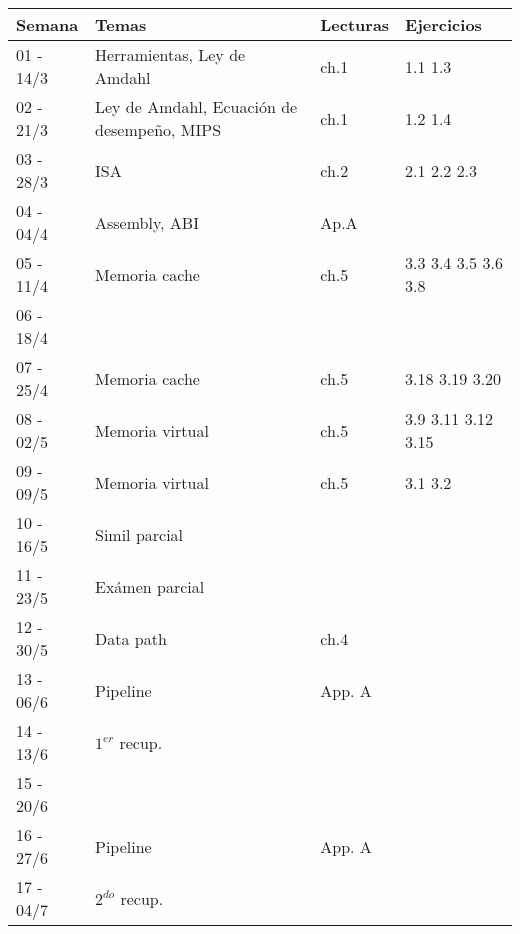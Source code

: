 \documentclass[9pt,a4paper]{article}
\begin{document}
\begin{tabular}{ |l | l | l | l |}
\hline
Semana & Temas			& Lecturas     & Ejercicios						\\
\hline
01 - 14/3	& Herramientas, Ley de Amdahl 		& ch.1 \cite{caaqa}	&	1.1 1.3		\\
\hline
02 - 21/3	& Ley de Amdahl, Ecuación de desempeño, MIPS & ch.1 \cite{caaqa}    & 1.2 1.4	\\
\hline
03 - 28/3	& ISA					&		ch.2 \cite{caaqa}	&	2.1 2.2 2.3				\\
\hline
04 - 04/4	& Assembly, ABI 	& 		Ap.A \cite{caaqa} \cite{abi} &	\\
\hline
05 - 11/4	& Memoria cache	& 	ch.5 \cite{caaqa}	&	3.3 3.4 3.5 3.6 3.8
\\
\hline
\rowcolor{lightgray} 06 - 18/4	& 	& 		&		\\
\hline
07 - 25/4	& Memoria cache	& 		ch.5 \cite{caaqa} &	 3.18 3.19 3.20
\\
\hline
08 - 02/5	& Memoria virtual	&	ch.5 \cite{caaqa} &	 3.9 3.11 3.12 3.15\\
\hline
09 - 09/5	& Memoria virtual	& 	ch.5 \cite{caaqa} \cite{vmp1} \cite{vmp2} &	3.1 3.2 \\
\hline
10 - 16/5	& Simil parcial	&		&							\\
\hline
\rowcolor{green} 11 - 23/5	& Exámen parcial	& 	&								\\
\hline
12 - 30/5	& Data path			& 	ch.4 \cite{coadhsi} & \\
\hline
13 - 06/6 & Pipeline			& App. A \cite{caaqa}	&	\\
\hline
\rowcolor{green} 14 - 13/6 & $1^{er}$ recup.	&		&							\\
\hline
\rowcolor{lightgray} 15 - 20/6	& 			&	&								\\
\hline
16 - 27/6 & Pipeline 	&	App. A \cite{caaqa}			& \\
\hline
\rowcolor{green} 17 - 04/7 & $2^{do}$ recup.			&		& \\
\hline

\end{tabular}

\renewcommand\refname{Lecturas}
\end{document}
